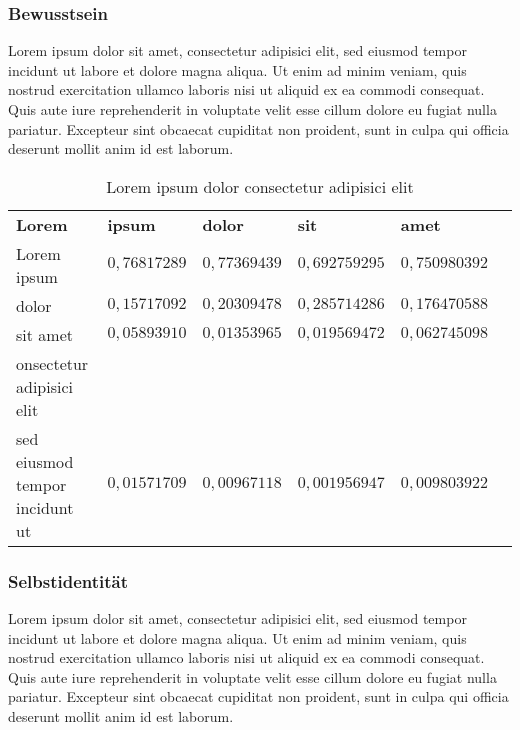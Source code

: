 \documentclass[12pt, a4paper, oneside]{article}
\begin{document}
\subsubsection{Bewusstsein}
Lorem ipsum dolor sit amet, consectetur adipisici elit, sed eiusmod tempor incidunt ut labore et dolore magna aliqua. Ut enim ad minim veniam, quis nostrud exercitation ullamco laboris nisi ut aliquid ex ea commodi consequat. Quis aute iure reprehenderit in voluptate velit esse cillum dolore eu fugiat nulla pariatur. Excepteur sint obcaecat cupiditat non proident, sunt in culpa qui officia deserunt mollit anim id est laborum.
%
\begin{tiny}
\begin{table}[!ht]
     \centering
     \begin{tabular}{llllll}
       \textbf{Lorem}  &\textbf{ipsum} & \textbf{dolor} & \textbf{sit} & \textbf{amet} \\
       Lorem ipsum  &  $0{,}76817289$ &  $0{,}77369439$ &  $0{,}692759295$  & $0{,}750980392$ \\
       dolor        & $0{,}15717092$ &  $0{,}20309478$ &  $0{,}285714286$ &  $0{,}176470588$ \\
       sit amet  &  $0{,}05893910$ & $0{,}01353965$ &  $0{,}019569472$ &  $0{,}062745098$ \\
       onsectetur adipisici elit \\sed eiusmod tempor incidunt ut & $0{,}01571709$ & $0{,}00967118$ & $0{,}001956947$ &  $ 0{,}009803922$  \\
     \end{tabular}

     \caption{Lorem ipsum dolor consectetur adipisici elit}
     \label{tbl:Tabellen 3}

   \end{table}
\end{tiny}
%

\subsubsection{Selbstidentität}
Lorem ipsum dolor sit amet, consectetur adipisici elit, sed eiusmod tempor incidunt ut labore et dolore magna aliqua. Ut enim ad minim veniam, quis nostrud exercitation ullamco laboris nisi ut aliquid ex ea commodi consequat. Quis aute iure reprehenderit in voluptate velit esse cillum dolore eu fugiat nulla pariatur. Excepteur sint obcaecat cupiditat non proident, sunt in culpa qui officia deserunt mollit anim id est laborum.
\end{document}

